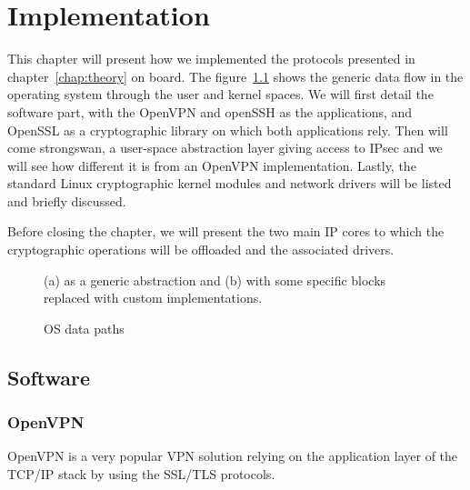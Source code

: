 \chapter{Implementation}
This chapter will present how we implemented the protocols presented in chapter~\ref{chap:theory} on board.
The figure~\ref{fig:os-path-generic} shows the generic data flow in the operating system through the user and kernel spaces.
We will first detail the software part, with the OpenVPN and openSSH as the applications, and OpenSSL as a cryptographic library on which both applications rely.
Then will come strongswan, a user-space abstraction layer giving access to IPsec and we will see how different it is from an OpenVPN implementation.
Lastly, the standard Linux cryptographic kernel modules and network drivers will be listed and briefly discussed.

Before closing the chapter, we will present the two main IP cores to which the cryptographic operations will be offloaded and the associated drivers.


\begin{figure}[ht]
\center
{}
\caption{OS data paths}{(a) as a generic abstraction and (b) with some specific blocks replaced with custom implementations.}
\label{fig:os-path-generic}
\end{figure}

\section{Software}

\subsection{OpenVPN}
OpenVPN is a very popular VPN solution relying on the application layer of the TCP/IP stack by using the SSL/TLS protocols.

